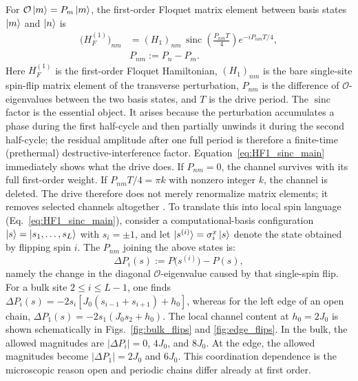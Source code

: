 \documentclass[aps,prb,reprint,twocolumn,amsmath,amssymb,citeautoscript]{revtex4-2}
\begin{document}
For $\mathcal{O}\ket{m}=P_m\ket{m}$, the first-order Floquet matrix element between basis states $\ket{m}$ and $\ket{n}$ is
\begin{eqnarray}
\bigl(H_F^{(1)}\bigr)_{nm}
&=
(H_1)_{nm}\,
\operatorname{sinc}\!\left(\frac{P_{nm}T}{4}\right)
e^{-iP_{nm}T/4},\\ \nonumber
&P_{nm}:=P_n-P_m .
\label{eq:HF1_sinc_main}
\end{eqnarray}
Here $H_F^{(1)}$ is the first-order Floquet Hamiltonian, $(H_1)_{nm}$ is the bare single-site spin-flip matrix element of the transverse perturbation, $P_{nm}$ is the difference of $\mathcal{O}$-eigenvalues between the two basis states, and $T$ is the drive period. The $\operatorname{sinc}$ factor is the essential object. It arises because the perturbation accumulates a phase during the first half-cycle and then partially unwinds it during the second half-cycle; the residual amplitude after one full period is therefore a finite-time (prethermal) destructive-interference factor. Equation~\eqref{eq:HF1_sinc_main} immediately shows what the drive does. If $P_{nm}=0$, the channel survives with its full first-order weight. If $P_{nm}T/4=\pi k$ with nonzero integer $k$, the channel is deleted. The drive therefore does not merely renormalize matrix elements; it removes selected channels altogether \cite{GhoshPaulSengupta2025Spin}.
To translate this into local spin language (Eq.~\eqref{eq:HF1_sinc_main}), consider a computational-basis configuration $\ket{s}=\ket{s_1,\dots,s_L}$ with $s_i=\pm 1$, and let $\ket{s^{(i)}}=\sigma_i^x\ket{s}$ denote the state obtained by flipping spin $i$. The $P_{nm}$ joining the above states is:
\begin{equation}
\Delta P_i(s):=P\!\bigl(s^{(i)}\bigr)-P(s),
\label{eq:DeltaP_main}
\end{equation}
namely the change in the diagonal $\mathcal{O}$-eigenvalue caused by that single-spin flip. For a bulk site $2\le i\le L-1$, one finds $\Delta P_i(s)=-2s_i\!\left[J_0(s_{i-1}+s_{i+1})+h_0\right]$, whereas for the left edge of an open chain, $\Delta P_1(s)=-2s_1(J_0s_2+h_0)$. The local channel content at $h_0=2J_0$ is shown schematically in Figs.~\ref{fig:bulk_flips} and \ref{fig:edge_flips}. In the bulk, the allowed magnitudes are $|\Delta P_i|=0$, $4J_0$, and $8J_0$. At the edge, the allowed magnitudes become $|\Delta P_1|=2J_0$ and $6J_0$. This coordination dependence is the microscopic reason open and periodic chains differ already at first order.
\end{document}
